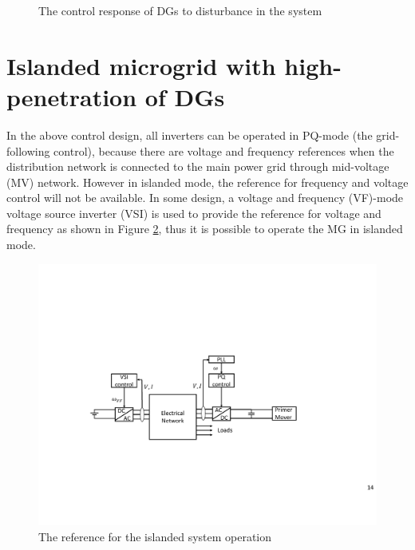 \documentclass{article}
\begin{document}
\begin{figure}[ht]
{    }
    \caption{The control response of DGs to disturbance in the system}
    \label{fig:phctrl}
\end{figure}

\section{Islanded microgrid with high-penetration of DGs}
In the above control design, all inverters can be operated in PQ-mode (the grid-following control), because there are voltage and frequency references when the distribution network is connected to the main power grid through mid-voltage (MV) network. However in islanded mode, the reference for frequency and voltage control will not be available. In some design, a voltage and frequency (VF)-mode voltage source inverter (VSI) \cite{Lopes2006} is used to provide the reference for voltage and frequency as shown in Figure \ref{fig:frq_sg}, thus it is possible to operate the MG in islanded mode. 
\begin{figure}[ht]
    \centering
    \includegraphics[width=\linewidth]{pics/vfmode.pdf}
    \caption{The reference for the islanded system operation}
    \label{fig:frq_sg}
\end{figure}
\end{document}
